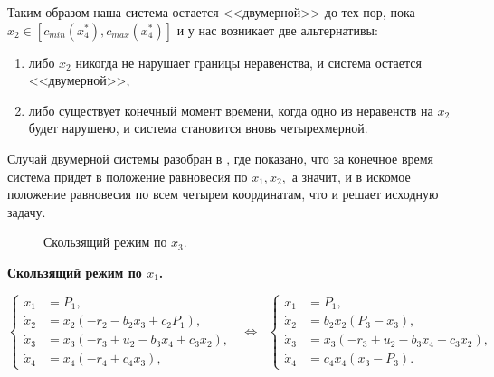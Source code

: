 \documentclass[11pt]{article}
\theoremstyle{definition}
\newcommand\beq{\begin{equation}}
\newcommand\eeq{\end{equation}}
\begin{document}
Таким образом наша система остается <<двумерной>> до тех пор, пока $x_2 \in [c_{min}(x_4^*), c_{max}(x_4^*)]$ и у нас возникает две альтернативы:
\begin{enumerate}
	\item либо $x_2$ никогда не нарушает границы неравенства, и система остается <<двумерной>>,
	\item либо существует конечный момент времени, когда одно из неравенств на $x_2$ будет нарушено, и система становится вновь четырехмерной.
\end{enumerate}

Случай двумерной системы разобран в \cite{Ruble}, где показано, что за конечное время система придет в положение равновесия по $x_1, x_2,$ а значит, и в искомое положение равновесия по всем четырем координатам, что и решает исходную задачу. \\

\begin{figure}[h]
\caption{Скользящий режим по $x_3$.}
\end{figure}

{\bf Скользящий режим по $x_1$.}

\beq
\left\{
\begin{aligned}
	x_1 &= P_1, \\
	\dot x_2 &= x_2(-r_2 - b_2x_3 + c_2P_1), \\
	\dot x_3 &= x_3(-r_3 + u_2 - b_3x_4 + c_3x_2), \\
	\dot x_4 &= x_4(-r_4 + c_4x_3), 
\end{aligned}
\right. \;\; \Leftrightarrow \;\;
\left\{
\begin{aligned}
	x_1 &= P_1, \\
	\dot x_2 &= b_2x_2(P_3 - x_3), \\
	\dot x_3 &= x_3(-r_3 + u_2 - b_3x_4 + c_3x_2), \\
	\dot x_4 &= c_4x_4(x_3 - P_3). 	
\end{aligned}
\label{system1}
\right.
\eeq
\end{document}
